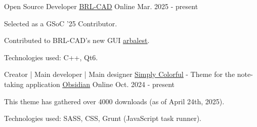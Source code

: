 



\begin{cventries}
  \cventry
    {Open Source Developer} %
    {\underline{\href{https://github.com/BRL-CAD/brlcad}{BRL-CAD}}} %
    {Online} %
    {Mar. 2025 - present} %
    {
      \begin{cvitems} %
        \item {Selected as a GSoC '25 Contributor.}
        \item {Contributed to BRL-CAD's new GUI \underline{\href{https://github.com/BRL-CAD/arbalest}{arbalest}}.}
        \item {Technologies used: C++, Qt6.}
      \end{cvitems}
    }

\end{cventries}




\begin{cventries}
  \cventry
    {Creator | Main developer | Main designer} %
    {\underline{\href{https://github.com/LorenzoPegorari/SimplyColorful}{Simply Colorful}} - Theme for the note-taking application \underline{\href{https://obsidian.md}{Obsidian}}} %
    {Online} %
    {Oct. 2024 - present} %
    {
      \begin{cvitems} %
        \item {This theme has gathered over 4000 downloads (as of April 24th, 2025).}
        \item {Technologies used: SASS, CSS, Grunt (JavaScript task runner).}
      \end{cvitems}
    }

\end{cventries}
